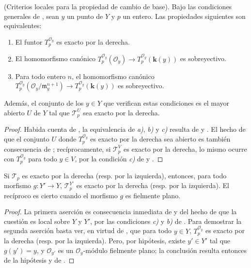 \begin{proposition}[7.7.10]
\label{III.7.7.10}
\textnormal{(Criterios locales para la propiedad de cambio de base).} Bajo las
condiciones generales de \textup{}, sean $y$ un punto de $Y$ y $p$ un
entero. Las propiedades siguientes son equivalentes:
\begin{enumerate}
  \item[\textup{a)}] El funtor $T_p^{\mathscr O_y}$ es exacto por la derecha.

  \item[\textup{b)}] El homomorfismo canónico
    $      T_p^{\mathscr O_y}(\mathscr O_y)
      \longrightarrow
      T_p^{\mathscr O_y}(\boldsymbol{k}(y))$
    es sobreyectivo.

  \item[\textup{c)}] Para todo entero $n$, el homomorfismo canónico
    $      T_p^{\mathscr O_y}
      (\mathscr O_y/\mathfrak m_y^{n+1})
      \longrightarrow
      T_p^{\mathscr O_y}(\boldsymbol{k}(y))$
    es sobreyectivo.
\end{enumerate}
Además, el conjunto de los $y\in Y$ que verifican estas condiciones es el
mayor abierto $U$ de $Y$ tal que $\mathscr T_p^U$ sea exacto por la derecha.
\end{proposition}

\begin{proof}
Habida cuenta de , la equivalencia de \emph{a)}, \emph{b)} y \emph{c)} resulta de
 y . El hecho de que el conjunto $U$ donde
$T_p^{\mathscr O_y}$ es exacto por la derecha sea abierto es también
consecuencia de ; recíprocamente, si $\mathscr T_p^V$ es exacto
por la derecha, lo mismo ocurre con $T_p^{\mathscr O_y}$ para todo $y\in V$,
por la condición \emph{c)} de  y .
\end{proof}

\begin{corollary}[7.7.11]
\label{III.7.7.11}
Si $\mathscr T_p$ es exacto por la derecha \textup{(resp.} por la izquierda\textup{)},
entonces, para todo morfismo $g:Y'\to Y$, $\mathscr T_p^{Y'}$ es exacto por la
derecha \textup{(resp.} por la izquierda\textup{)}. El recíproco es cierto cuando el
morfismo $g$ es fielmente plano.
\end{corollary}

\begin{proof}
La primera aserción es consecuencia inmediata de  y del hecho
de que la cuestión es local sobre $Y$ y $Y'$, por las condiciones \emph{c)} y \emph{b)} de
. Para demostrar la segunda aserción basta ver, en virtud de
, que para todo $y\in Y$, $T_p^{\mathscr O_y}$ es exacto por
la derecha (resp. por la izquierda). Pero, por hipótesis, existe
$y'\in Y'$ tal que $g(y')=y$, y $\mathscr O_{y'}$ es un
$\mathscr O_y$-módulo fielmente plano; la conclusión resulta entonces de la
hipótesis y de .
\end{proof}

